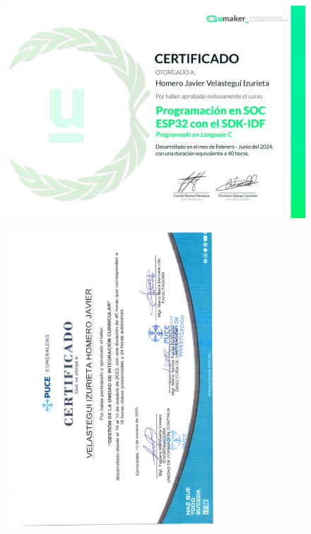 \FloatBarrier
\begin{figure}[ht]
    \setlength{\parindent}{-20pt}
    \includegraphics[width=\textwidth]{2.-Estudios/Certificados/22.pdf}
\end{figure}

\begin{figure}[ht]
    \setlength{\parindent}{-20pt}
    \includegraphics[width=0.7\textwidth, angle=-90]{2.-Estudios/Certificados/21.pdf}
\end{figure}


